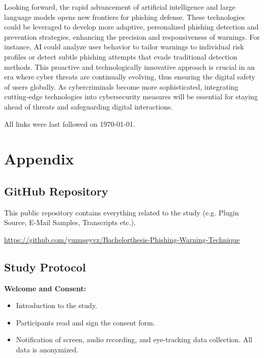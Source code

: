 \documentclass[
  a4paper,  %
  twoside,  %
  bibliography=totoc,
  headsepline,
  cleardoublepage=empty,
  parskip=half,
  draft=false
]{scrbook}
\begin{document}
Looking forward, the rapid advancement of artificial intelligence and large language models opens new frontiers for phishing defense. These technologies could be leveraged to develop more adaptive, personalized phishing detection and prevention strategies, enhancing the precision and responsiveness of warnings. For instance, AI could analyze user behavior to tailor warnings to individual risk profiles or detect subtle phishing attempts that evade traditional detection methods. This proactive and technologically innovative approach is crucial in an era where cyber threats are continually evolving, thus ensuring the digital safety of users globally. As cybercriminals become more sophisticated, integrating cutting-edge technologies into cybersecurity measures will be essential for staying ahead of threats and safeguarding digital interactions.




 
\printbibliography

All links were last followed on \today{}.

\appendix
\chapter{Appendix}

\section{GitHub Repository}
\label{sec:github}
This public repository contains everything related to the study (e.g. Plugin Source, E-Mail Samples, Transcripts etc.).\par
\href{https://github.com/yunuseyvz/Bachelorthesis-Phishing-Warning-Techniques}{https://github.com/yunuseyvz/Bachelorthesis-Phishing-Warning-Technique}


\section{Study Protocol}
\label{sec:protocol}
\textbf{Welcome and Consent:}
\begin{itemize}
    \item Introduction to the study.
    \item Participants read and sign the consent form.
    \item Notification of screen, audio recording, and eye-tracking data collection. All data is anonymized.
\end{itemize}
\end{document}

